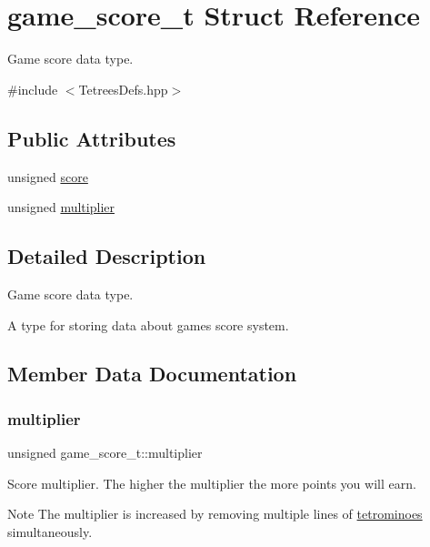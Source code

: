 \hypertarget{structgame__score__t}{}\section{game\+\_\+score\+\_\+t Struct Reference}
\label{structgame__score__t}


Game score data type.  




{\ttfamily \#include $<$Tetrees\+Defs.\+hpp$>$}

\subsection*{Public Attributes}
\begin{DoxyCompactItemize}
\item 
unsigned \hyperlink{structgame__score__t_ad31c74c891223f5649797cbd13a86de8}{score}
\item 
unsigned \hyperlink{structgame__score__t_a9dbd70f0cf1f4258895ff90db228297d}{multiplier}
\end{DoxyCompactItemize}


\subsection{Detailed Description}
Game score data type. 

A type for storing data about game\textquotesingle{}s score system. 

\subsection{Member Data Documentation}
\mbox{\label{structgame__score__t_a9dbd70f0cf1f4258895ff90db228297d}} 
\subsubsection{\texorpdfstring{multiplier}{multiplier}}
{\footnotesize\ttfamily unsigned game\+\_\+score\+\_\+t\+::multiplier}

Score multiplier. The higher the multiplier the more points you will earn. \begin{DoxyNote}{Note}
The multiplier is increased by removing multiple lines of \hyperlink{TetreesDefs_8hpp_adf4f8e2cbbd7d8894fe3beda39db1b8f}{tetrominoes} simultaneously. 
\end{DoxyNote}
\mbox{\label{structgame__score__t_ad31c74c891223f5649797cbd13a86de8}} 
